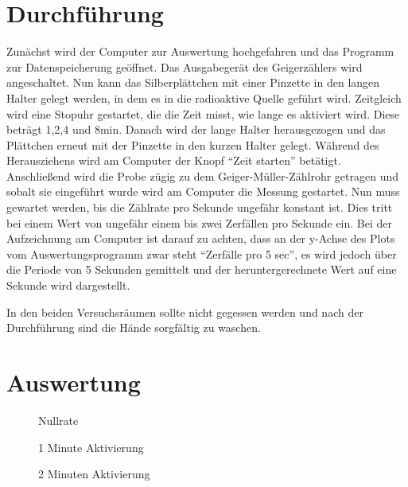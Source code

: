 \documentclass[12pt,a4paper,titlepage,headinclude,bibtotoc]{scrartcl}
\begin{document}
                                                                                                                                                                      
\section{Durchführung}
\label{sec:durchfuehrung}
Zunächst wird der Computer zur Auswertung hochgefahren und das Programm zur Datenspeicherung geöffnet.
Das Ausgabegerät des Geigerzählers wird angeschaltet.
Nun kann das Silberplättchen mit einer Pinzette in den langen Halter gelegt werden, in dem es in die radioaktive Quelle geführt wird.
Zeitgleich wird eine Stopuhr gestartet, die die Zeit misst, wie lange es aktiviert wird.
Diese beträgt 1,2,4 und $8\si\minute$.
Danach wird der lange Halter herausgezogen und das Plättchen erneut mit der Pinzette in den kurzen Halter gelegt.
Während des Herausziehens wird am Computer der Knopf "`Zeit starten"' betätigt.
Anschließend wird die Probe zügig zu dem Geiger-Müller-Zählrohr getragen und sobalt sie eingeführt wurde wird am Computer die Messung gestartet.
Nun muss gewartet werden, bis die Zählrate pro Sekunde ungefähr konstant ist.
Dies tritt bei einem Wert von ungefähr einem bis zwei Zerfällen pro Sekunde ein.
Bei der Aufzeichnung am Computer ist darauf zu achten, dass an der y-Achse des Plots vom Auswertungsprogramm zwar steht "`Zerfälle pro 5 sec"', es wird jedoch über die Periode von 5 Sekunden gemittelt und der heruntergerechnete Wert auf eine Sekunde wird dargestellt.

In den beiden Versuchsräumen sollte nicht gegessen werden und nach der Durchführung sind die Hände sorgfältig zu waschen.


\section{Auswertung}
\label{sec:auswertung}

\begin{figure}[h]
	\centering
	
	\caption{Nullrate}
	\label{fig:null}
\end{figure}

\begin{figure}[h]
\centering

\caption{1 Minute Aktivierung}
\label{fig:1min}
\end{figure}

\begin{figure}[h]
\centering

\caption{2 Minuten Aktivierung}
\label{fig:2min}
\end{figure}
\end{document}
